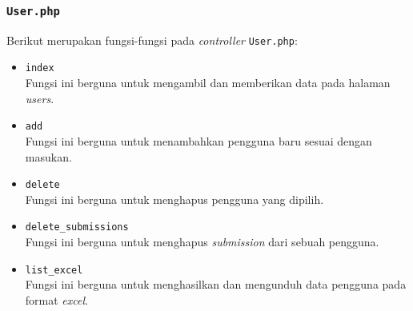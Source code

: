 \subsubsection{\texttt{User.php}}
Berikut merupakan fungsi-fungsi pada \textit{controller} \texttt{User.php}:
\begin{itemize}
	\item \texttt{index}\\
	Fungsi ini berguna untuk mengambil dan memberikan data pada halaman \textit{users}.
	\item \texttt{add}\\
	Fungsi ini berguna untuk menambahkan pengguna baru sesuai dengan masukan.
	\item \texttt{delete}\\
	Fungsi ini berguna untuk menghapus pengguna yang dipilih.
	\item \texttt{delete\_submissions}\\
	Fungsi ini berguna untuk menghapus \textit{submission} dari sebuah pengguna.
	\item \texttt{list\_excel}\\
	Fungsi ini berguna untuk menghasilkan dan mengunduh data pengguna pada format \textit{excel}.
\end{itemize}

